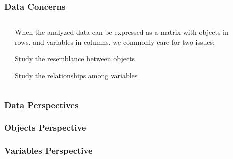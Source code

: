 \documentclass[12pt]{beamer}\usepackage[]{graphicx}\usepackage[]{color}
\begin{document}
\begin{frame}
\frametitle{Data Concerns}

\begin{columns}[t]
\begin{column}{0.1\textwidth}
\end{column}

\begin{column}{0.8\textwidth}
When the analyzed data can be expressed as a matrix with objects in rows, and variables in columns, we commonly care for two issues:
\bi
 \item Study the {\hilit resemblance between objects}
 \item Study the {\hilit relationships among variables}
\ei
\eb
\end{column}

\begin{column}{0.1\textwidth}
\end{column}
\end{columns}

\end{frame}


\begin{frame}
\frametitle{Data Perspectives}
\begin{center}
\end{center}
\end{frame}


\begin{frame}
\frametitle{Objects Perspective}
\begin{center}
\end{center}
\end{frame}


\begin{frame}
\frametitle{}
\begin{center}
\end{center}
\end{frame}


\begin{frame}
\frametitle{Variables Perspective}
\begin{center}
\end{center}
\end{frame}
\end{document}

